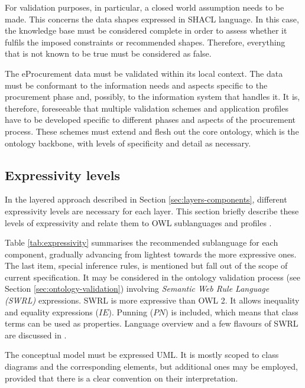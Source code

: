 	For validation purposes, in particular, a closed world assumption needs to be made. This concerns the data shapes expressed in SHACL language. In this case, the knowledge base must be considered complete in order to assess whether it fulfils the imposed constraints or recommended shapes. Therefore, everything that is not known to be true must be considered as false. 
	
	The eProcurement data must be validated within its local context. The data must be conformant to the information needs and aspects specific to the procurement phase and, possibly, to the information system that handles it. It is, therefore, foreseeable that multiple validation schemes and application profiles have to be developed specific to different phases and aspects of the procurement process. These schemes must extend and flesh out the core ontology, which is the ontology backbone, with levels of specificity and detail as necessary. 
	
	
	\subsection{Expressivity levels}
	\label{sec:expressivity}

	In the layered approach described in Section \ref{sec:layers-components}, different expressivity levels are necessary for each layer. This section briefly describe these levels of expressivity and relate them to OWL sublanguages \citep{owl1} and profiles \citep{owl2-profiles}. 
	
	Table \ref{tab:expressivity} summarises the recommended sublanguage for each component, gradually advancing from lightest towards the more expressive ones. The last item, special inference rules, is mentioned but fall out of the scope of current specification. It may be considered in the ontology validation process (see Section \ref{sec:ontology-validation}) involving \textit{Semantic Web Rule Language (SWRL)} expressions. SWRL \citep{swrl-horrocks2004} is more expressive than OWL 2. It allows inequality and equality expressions ($IE$). Punning ($PN$) is included, which means that class terms can be used as properties. Language overview and a few flavours of SWRL are discussed in \cite{swrl-expressivness}.
	
	The conceptual model must be expressed UML. It is mostly scoped to class diagrams and the corresponding elements, but additional ones may be employed, provided that there is a clear convention on their interpretation. 
	
